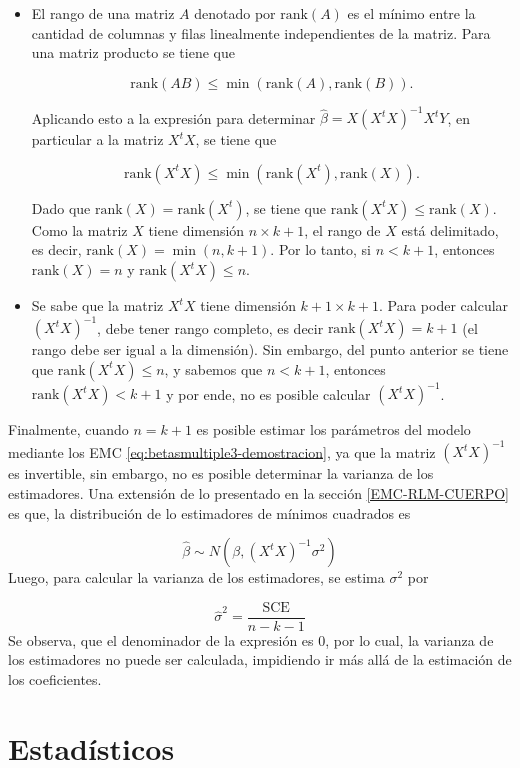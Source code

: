 \documentclass[
  11pt,
]{book}
\theoremstyle{definition}
\theoremstyle{definition}
\theoremstyle{definition}
\theoremstyle{definition}
\theoremstyle{remark}
\begin{document}
\begin{itemize}
\item
  El rango de una matriz \(A\) denotado por \(\text{rank}(A)\) es el mínimo entre la cantidad de columnas y filas linealmente independientes de la matriz. Para una matriz producto se tiene que

  \[\text{rank}(AB) \leq \min(\text{rank}(A), \text{rank}(B)).\]

  Aplicando esto a la expresión para determinar \(\widehat{\beta} = X(X^tX)^{-1}X^tY\), en particular a la matriz \(X^tX\), se tiene que

  \[\text{rank}(X^tX) \leq \min(\text{rank}(X^t), \text{rank}(X)).\]

  Dado que \(\text{rank}(X) = \text{rank}(X^t)\), se tiene que \(\text{rank}(X^tX) \leq \text{rank}(X)\). Como la matriz \(X\) tiene dimensión \(n \times k+1\), el rango de \(X\) está delimitado, es decir, \(\text{rank}(X) = \min(n,k+1)\). Por lo tanto, si \(n < k+1\), entonces \(\text{rank}(X) = n\) y \(\text{rank}(X^tX) \leq n\).
\item
  Se sabe que la matriz \(X^tX\) tiene dimensión \(k+1 \times k+1\). Para poder calcular \((X^tX)^{-1}\), debe tener rango completo, es decir \(\text{rank}(X^tX) = k+1\) (el rango debe ser igual a la dimensión). Sin embargo, del punto anterior se tiene que \(\text{rank}(X^tX) \leq n\), y sabemos que \(n < k+1\), entonces \(\text{rank}(X^tX) < k+1\) y por ende, no es posible calcular \((X^tX)^{-1}\).
\end{itemize}

Finalmente, cuando \(n=k+1\) es posible estimar los parámetros del modelo mediante los EMC \eqref{eq:betasmultiple3-demostracion}, ya que la matriz \((X^tX)^{-1}\) es invertible, sin embargo, no es posible determinar la varianza de los estimadores. Una extensión de lo presentado en la sección \ref{EMC-RLM-CUERPO} es que, la distribución de lo estimadores de mínimos cuadrados es

\[
\widehat{\beta} \sim N(\beta, (X^tX)^{-1}\sigma^2)
\]
Luego, para calcular la varianza de los estimadores, se estima \(\sigma^2\) por

\[
\widehat{\sigma}^2 = \frac{\text{SCE}}{n-k-1}
\]
Se observa, que el denominador de la expresión es 0, por lo cual, la varianza de los estimadores no puede ser calculada, impidiendo ir más allá de la estimación de los coeficientes.

\chapter{Estadísticos}\label{estaduxedsticos}
\end{document}
